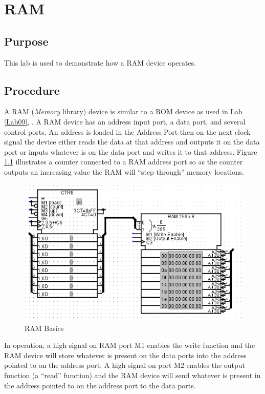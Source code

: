 \chapter{RAM}

\section{Purpose}

This lab is used to demonstrate how a \acf{RAM} device operates. 

\section{Procedure}

A RAM (\textit{Memory} library) device is similar to a ROM device as used in Lab \ref{Lab09}, . A RAM device has an address input port, a data port, and several control ports. An address is loaded in the Address Port then on the next clock signal the device either reads the data at that address and outputs it on the data port or inputs whatever is on the data port and writes it to that address. Figure \ref{fig:10-01} illustrates a counter connected to a RAM address port so as the counter outputs an increasing value the RAM will ``step through'' memory locations.

\begin{figure}[H]
	\centering
	\includegraphics[width=\maxwidth{.95\linewidth}]{gfx/10-01}
	\caption{RAM Basics}
	\label{fig:10-01}
\end{figure}

In operation, a high signal on RAM port M1 enables the write function and the RAM device will store whatever is present on the data ports into the address pointed to on the address port. A high signal on port M2 enables the output function (a ``read'' function) and the RAM device will send whatever is present in the address pointed to on the address port to the data ports.

